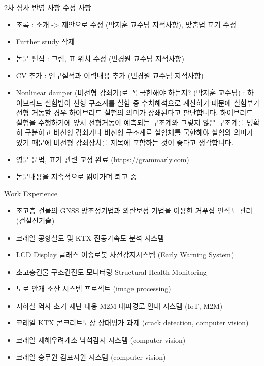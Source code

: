 \documentclass[usepdftitle=false]{beamer}
\begin{document}
\begin{frame}{2차 심사 반영 사항 수정 사항}
\begin{itemize}
   \item 초록 : 소개 -> 제안으로 수정 (박지훈 교수님 지적사항), 맞춤법 표기 수정
   \item Further study 삭제
   \item 논문 편집 : 그림, 표 위치 수정 (민경원 교수님 지적사항)
   \item CV 추가 : 연구실적과 이력내용 추가 (민경원 교수님 지적사항)
   \item Nonlinear damper (비선형 감쇠기)로 꼭 국한해야 하는지? (박지훈 교수님) : 하이브리드 실험법이 선형 구조계를 실험 중 수치해석으로 계산하기 때문에 실험부가 선형 거동할 경우 하이브리드 실험의 의미가 상쇄된다고 판단합니다. 하이브리드 실험을 수행하기에 앞서 선형거동이 예측되는 구조계와 그렇지 않은 구조계를 명확히 구분하고 비선형 감쇠기나 비선형 구조계로 실험체를 국한해야 실험의 의미가 있기 때문에 비선형 감쇠장치를 제목에 포함하는 것이 좋다고 생각합니다.
   \item 영문 문법, 표기 관련 교정 완료 (https://grammarly.com)
   \item 논문내용을 지속적으로 읽어가며 퇴고 중.
\end{itemize}
\end{frame}

\begin{frame}{Work Experience}
\begin{itemize}
   \item 초고층 건물의 GNSS 망조정기법과 외란보정 기법을 이용한 거푸집 연직도 관리 (건설신기술)
   \item 코레일 공항철도 및 KTX 진동가속도 분석 시스템
   \item LCD Display 글래스 이송로봇 사전감지시스템 (Early Warning System)
   \item 초고층건물 구조건전도 모니터링 Structural Health Monitoring
   \item 도로 안개 소산 시스템 프로젝트 (image processing)
   \item 지하철 역사 초기 재난 대응 M2M 대피경로 안내 시스템 (IoT, M2M)
   \item 코레일 KTX 콘크리트도상 상태평가 과제 (crack detection, computer vision)
   \item 코레일 재해우려개소 낙석감지 시스템 (computer vision)
   \item 코레일 승무원 검표지원 시스템 (computer vision)
\end{itemize}
\end{frame}
\end{document}
